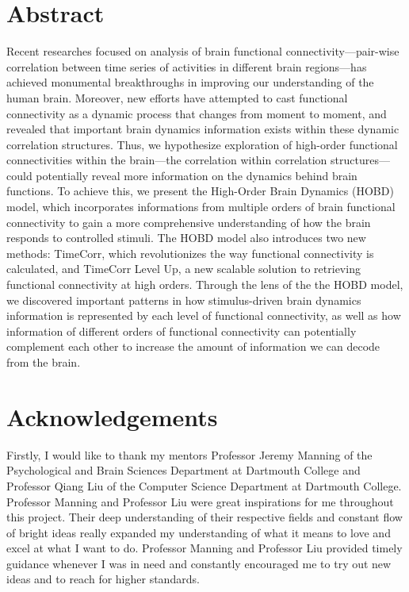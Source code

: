 \documentclass[11pt]{article}
\begin{document}
\section{Abstract}
Recent researches focused on analysis of brain functional connectivity---pair-wise correlation between time series of activities in different brain regions---has achieved monumental breakthroughs in improving our understanding of the human brain. Moreover, new efforts have attempted to cast functional connectivity as a dynamic process that changes from moment to moment, and revealed that  important brain dynamics information exists within these dynamic correlation structures. Thus, we hypothesize exploration of high-order functional connectivities within the brain---the correlation within correlation structures---could potentially reveal more information on the dynamics behind brain functions. To achieve this, we present the High-Order Brain Dynamics (HOBD) model, which incorporates informations from multiple orders of brain functional connectivity to gain a more comprehensive understanding of how the brain responds to controlled stimuli. The HOBD model also introduces two new methods: TimeCorr, which revolutionizes the way functional connectivity is calculated, and TimeCorr Level Up, a new scalable solution to retrieving functional connectivity at high orders. Through the lens of the the HOBD model, we discovered important patterns in how stimulus-driven brain dynamics information is represented by each level of functional connectivity, as well as how information of different orders of functional connectivity can potentially complement each other to increase the amount of information we can decode from the brain.

\newpage
\section{Acknowledgements}
Firstly, I would like to thank my mentors Professor Jeremy Manning of the Psychological and Brain Sciences Department at Dartmouth College and Professor Qiang Liu of the Computer Science Department at Dartmouth College. Professor Manning and Professor Liu were great inspirations for me throughout this project. Their deep understanding of their respective fields and constant flow of bright ideas really expanded my understanding of what it means to love and excel at what I want to do. Professor Manning and Professor Liu provided timely guidance whenever I was in need and constantly encouraged me to try out new ideas and to reach for higher standards.
\end{document}
